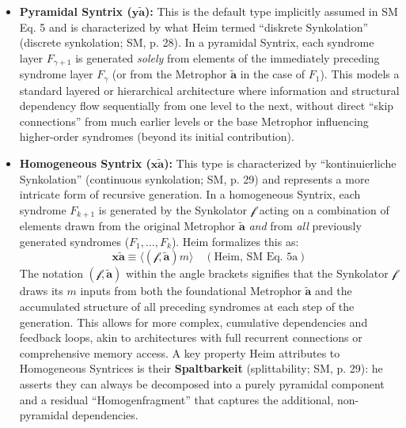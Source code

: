 \documentclass[
    12pt,              %
    a4paper,           %
    headings=normal,   %
    twoside=true,      %
    BCOR=8mm,          %
]{scrbook}
\newcommand{\q}[1]{\enquote{#1}}
\newcommand{\syntrix}{\bm{y\widetilde{a}}}
\newcommand{\homogeneoussyntrix}{\bm{x\widetilde{a}}}
\newcommand{\metrophor}{\bm{\widetilde{a}}}
\newcommand{\synkolator}{\mathcal{f}}
\newcommand{\synkolationsstufe}{m}
\newcommand{\syndrom}{F}
\begin{document}
\begin{itemize}
    \item   \textbf{Pyramidal Syntrix (\(\syntrix\)):} This is the default type implicitly assumed in SM Eq. 5 and is characterized by what Heim termed \q{diskrete Synkolation} (discrete synkolation; SM, p. 28). In a pyramidal Syntrix, each syndrome layer \(\syndrom_{\gamma+1}\) is generated \textit{solely} from elements of the immediately preceding syndrome layer \(\syndrom_\gamma\) (or from the Metrophor \(\metrophor\) in the case of \(\syndrom_1\)). This models a standard layered or hierarchical architecture where information and structural dependency flow sequentially from one level to the next, without direct \q{skip connections} from much earlier levels or the base Metrophor influencing higher-order syndromes (beyond its initial contribution).

    \item   \textbf{Homogeneous Syntrix (\(\homogeneoussyntrix\)):} This type is characterized by \q{kontinuierliche Synkolation} (continuous synkolation; SM, p. 29) and represents a more intricate form of recursive generation. In a homogeneous Syntrix, each syndrome \(\syndrom_{k+1}\) is generated by the Synkolator \(\synkolator\) acting on a combination of elements drawn from the original Metrophor \(\metrophor\) \textit{and} from \textit{all} previously generated syndromes (\(\syndrom_1, \ldots, \syndrom_k\)). Heim formalizes this as:
    \begin{equation} \label{eq:original_homogeneous_syntrix} 
    \homogeneoussyntrix \equiv \langle (\synkolator, \metrophor) \synkolationsstufe \rangle \quad (\text{Heim, SM Eq. 5a})
    \end{equation}
    The notation \((\synkolator, \metrophor)\) within the angle brackets signifies that the Synkolator \(\synkolator\) draws its \(\synkolationsstufe\) inputs from both the foundational Metrophor \(\metrophor\) and the accumulated structure of all preceding syndromes at each step of the generation. This allows for more complex, cumulative dependencies and feedback loops, akin to architectures with full recurrent connections or comprehensive memory access. A key property Heim attributes to Homogeneous Syntrices is their \textbf{Spaltbarkeit} (splittability; SM, p. 29): he asserts they can always be decomposed into a purely pyramidal component and a residual \q{Homogenfragment} that captures the additional, non-pyramidal dependencies.
\end{itemize}
\end{document}
